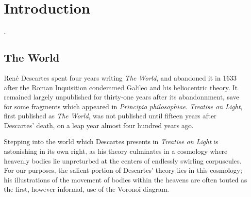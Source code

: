 \documentclass[12pt,twoside]{reedthesis}
\begin{document}

  \mainmatter %
  \pagestyle{fancyplain} %


  \chapter*{Introduction}
    \setcounter{chapter}{1}
    \setcounter{section}{0}

  \citep[][p. 21]{descartes}.

  \section{The World} %
  \label{sec:the_world}
    Ren\'{e} Descartes spent four years writing \emph{The World}, and abandoned it in 1633 after the Roman Inquisition condemmed Galileo and his heliocentric theory. It remained largely unpublished for thirty-one years after its abandonnment, save for some fragments which appeared in \emph{Principia philosophiae}. \emph{Treatise on Light}, first published as \emph{The World}, was not published until fifteen years after Descartes' death, on a leap year almost four hundred years ago. \par

    Stepping into the world which Descartes presents in \emph{Treatise on Light} is astonishing in its own right, as his theory culminates in a cosmology where heavenly bodies lie unpreturbed at the centers of endlessly swirling corpuscules. For our purposes, the salient portion of Descartes' theory lies in this cosmology; his illustrations of the movement of bodies within the heavens are often touted as the first, however informal, use of the Voronoi diagram. \par
\end{document}
